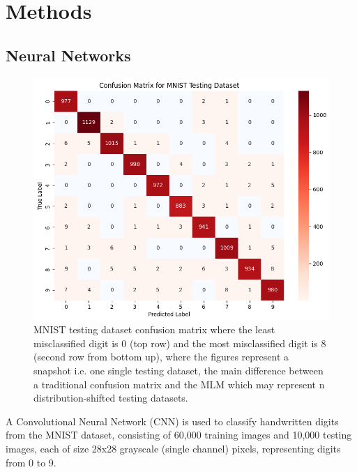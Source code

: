 
\section{Methods}

\subsection{Neural Networks}

\begin{figure}[h]
    \centering
    \includegraphics[width=0.99\columnwidth]{Figures/mnist_testing_dataset_confusion_matrix.png}   %
    \caption{MNIST testing dataset confusion matrix where the least misclassified digit is 0 (top row) and the most misclassified digit is 8 (second row from bottom up), where the figures represent a snapshot i.e. one single testing dataset, the main difference between a traditional confusion matrix and the MLM which may represent n distribution-shifted testing datasets.}
\label{fig:mnist_testing_dataset_confusion_matrix}
\end{figure}

A Convolutional Neural Network (CNN) is used to classify handwritten digits from the MNIST dataset, consisting of 60,000 training images and 10,000 testing images, each of size 28x28 grayscale (single channel) pixels, representing digits from 0 to 9.

